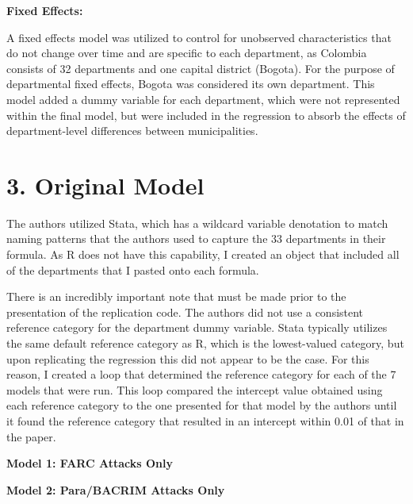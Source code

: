 \documentclass[12pt,letterpaper]{article}
\begin{document}
	\textbf{Fixed Effects:}
	
	A fixed effects model was utilized to control for unobserved characteristics that do not change over time and are specific to each department, as Colombia consists of 32 departments and one capital district (Bogota). For the purpose of departmental fixed effects, Bogota was considered its own department. This model added a dummy variable for each department, which were not represented within the final model, but were included in the regression to absorb the effects of department-level differences between municipalities.
	
	\vspace{.8cm}
	
	\section*{3. Original Model}
	
	\noindent The authors utilized Stata, which has a wildcard variable denotation to match naming patterns that the authors used to capture the 33 departments in their formula. As R does not have this capability, I created an object that included all of the departments that I pasted onto each formula.
	
	
	
	\noindent There is an incredibly important note that must be made prior to the presentation of the replication code. The authors did not use a consistent reference category for the department dummy variable. Stata typically utilizes the same default reference category as R, which is the lowest-valued category, but upon replicating the regression this did not appear to be the case. For this reason, I created a loop that determined the reference category for each of the 7 models that were run. This loop compared the intercept value obtained using each reference category to the one presented for that model by the authors until it found the reference category that resulted in an intercept within 0.01 of that in the paper.
	
	\vspace{.5cm}
	
	\noindent\textbf{Model 1: FARC Attacks Only}
	
	
	
	\noindent\textbf{Model 2: Para/BACRIM Attacks Only}
	
\end{document}
